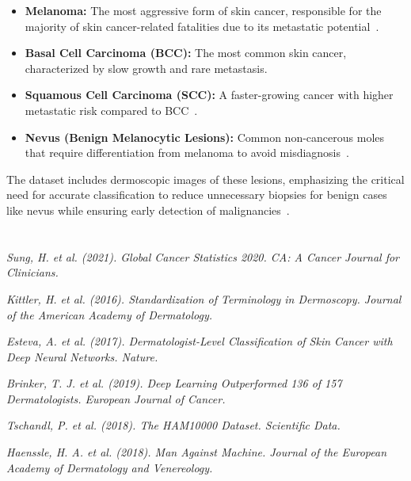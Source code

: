 \documentclass[a4paper,12pt]{report}
\begin{document}
\begin{spacing}{1.5}
    \begin{itemize}
        \item \textbf{Melanoma:} The most aggressive form of skin cancer, responsible for the majority of skin cancer-related fatalities due to its metastatic potential~\cite{dl12}.
        \item \textbf{Basal Cell Carcinoma (BCC):} The most common skin cancer, characterized by slow growth and rare metastasis.
        \item \textbf{Squamous Cell Carcinoma (SCC):} A faster-growing cancer with higher metastatic risk compared to BCC~\cite{dl13}.
        \item \textbf{Nevus (Benign Melanocytic Lesions):} Common non-cancerous moles that require differentiation from melanoma to avoid misdiagnosis~\cite{dl14}.
    \end{itemize}
    The dataset includes dermoscopic images of these lesions, emphasizing the critical need for accurate classification to reduce unnecessary biopsies for benign cases like nevus while ensuring early detection of malignancies~\cite{dl15}.


\chapter{}

\begin{thebibliography}{99}



 \emph{Sung, H. et al. (2021). Global Cancer Statistics 2020. CA: A Cancer Journal for Clinicians.}

 \emph{Kittler, H. et al. (2016). Standardization of Terminology in Dermoscopy. Journal of the American Academy of Dermatology.}

 \emph{Esteva, A. et al. (2017). Dermatologist-Level Classification of Skin Cancer with Deep Neural Networks. Nature.}

 \emph{Brinker, T. J. et al. (2019). Deep Learning Outperformed 136 of 157 Dermatologists. European Journal of Cancer.}

 \emph{Tschandl, P. et al. (2018). The HAM10000 Dataset. Scientific Data.}

 \emph{Haenssle, H. A. et al. (2018). Man Against Machine. Journal of the European Academy of Dermatology and Venereology.}


\end{thebibliography}
\end{spacing}
\end{document}
